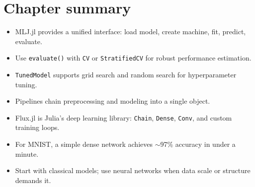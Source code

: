 \section{Chapter summary}

\begin{itemize}
  \item MLJ.jl provides a unified interface: load model, create machine, fit, predict, evaluate.
  \item Use \texttt{evaluate()} with \texttt{CV} or \texttt{StratifiedCV} for robust performance estimation.
  \item \texttt{TunedModel} supports grid search and random search for hyperparameter tuning.
  \item Pipelines chain preprocessing and modeling into a single object.
  \item Flux.jl is Julia's deep learning library: \texttt{Chain}, \texttt{Dense}, \texttt{Conv}, and custom training loops.
  \item For MNIST, a simple dense network achieves $\sim$97\% accuracy in under a minute.
  \item Start with classical models; use neural networks when data scale or structure demands it.
\end{itemize}
